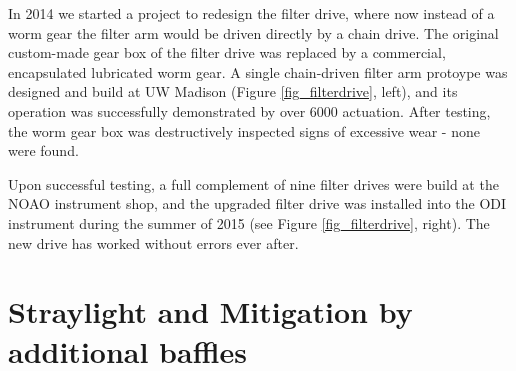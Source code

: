 \documentclass[]{spieman}
\begin{document}
In 2014 we  started a project to redesign the filter drive, where now 
instead of a worm gear the filter arm would be driven directly by a chain 
drive. The original custom-made gear box of the filter drive was replaced by a commercial, 
encapsulated lubricated worm gear. A single chain-driven filter arm protoype was designed and build
at UW Madison (Figure \ref{fig_filterdrive}, left), and its operation was  successfully demonstrated 
by  over 6000 actuation. After testing, the worm gear box was destructively inspected signs of 
excessive wear - none  were found. 

Upon successful testing, a full complement of nine filter drives were build at 
the NOAO instrument shop, and the upgraded filter drive was installed into the 
ODI instrument during the summer of 2015 (see Figure \ref{fig_filterdrive}, 
right). The new drive has worked without  errors ever after. 



\section{Straylight and Mitigation by additional baffles}
\end{document}
